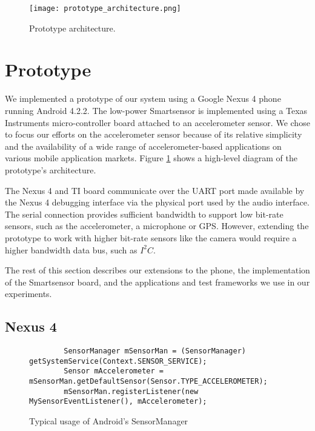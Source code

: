 
\begin{figure}[t]
	\texttt{[image: prototype\_architecture.png]}
	\caption{Prototype architecture.}
    \label{fig:prototypeArchitecture}
\end{figure}

\section{Prototype}
\label{sec:prototype}

We implemented a prototype of our system using a Google Nexus 4 phone
running Android 4.2.2.  The low-power Smartsensor is implemented using
a Texas Instruments micro-controller board attached to an
accelerometer sensor.  We chose to focus our efforts on the
accelerometer sensor because of its relative simplicity and the
availability of a wide range of accelerometer-based applications on
various mobile application markets.  Figure
\ref{fig:prototypeArchitecture} shows a high-level diagram of the
prototype's architecture.

The Nexus 4 and TI board communicate over the UART port made available
by the Nexus 4 debugging interface via the physical port used by the
audio interface.  The serial connection provides sufficient bandwidth
to support low bit-rate sensors, such as the accelerometer, a
microphone or GPS.  However, extending the prototype to work with
higher bit-rate sensors like the camera would require a higher
bandwidth data bus, such as $I^2C$.

The rest of this section describes our extensions to the phone, the
implementation of the Smartsensor board, and the applications and test
frameworks we use in our experiments.

\subsection{Nexus 4}
\label{subsec:nexus}

\begin{figure*}[t]
{\small
	\begin{verbatim}
		SensorManager mSensorMan = (SensorManager) getSystemService(Context.SENSOR_SERVICE);
		Sensor mAccelerometer = mSensorMan.getDefaultSensor(Sensor.TYPE_ACCELEROMETER);
		mSensorMan.registerListener(new MySensorEventListener(), mAccelerometer);
	\end{verbatim}
}
	\caption{Typical usage of Android's SensorManager}
    \label{fig:androidSensorCodeNormal}
\end{figure*}


